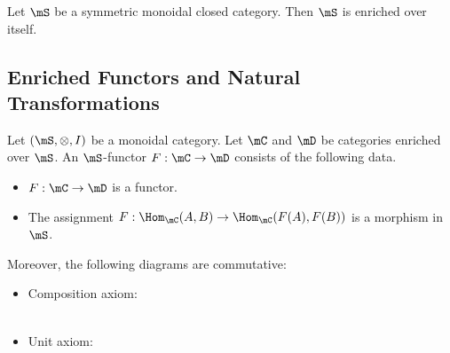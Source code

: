 \documentclass[a4paper]{article}
\begin{document}
\begin{prp}{}{} Let $\mS$ be a symmetric monoidal closed category. Then $\mS$ is enriched over itself. 
\end{prp}

\subsection{Enriched Functors and Natural Transformations}
\begin{defn}{}{} Let $(\mS,\otimes,I)$ be a monoidal category. Let $\mC$ and $\mD$ be categories enriched over $\mS$. An $\mS$-functor $F:\mC\to\mD$ consists of the following data. 
\begin{itemize}
\item $F:\mC\to\mD$ is a functor. 
\item The assignment $F:\Hom_\mC(A,B)\to\Hom_\mC(F(A),F(B))$ is a morphism in $\mS$. 
\end{itemize}
Moreover, the following diagrams are commutative: 
\begin{itemize}
\item Composition axiom: \\
\\
\item Unit axiom: \\
\\
\end{itemize}
\end{defn}
\end{document}
